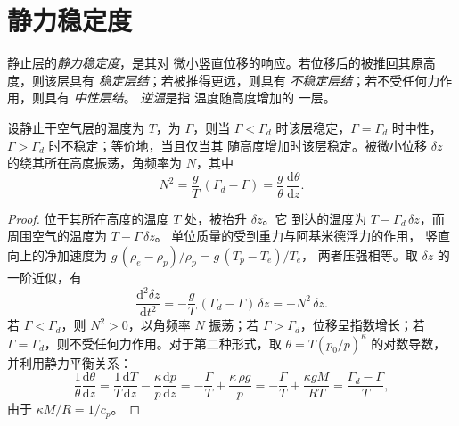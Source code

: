 \section{静力稳定度}\label{sec:b1:fluid-envelopes-structure:stability}

\begin{definition}[静力稳定度；逆温]\label{def:b1:fluid-envelopes-structure:stability}
静止层的\emph{静力稳定度}，是其对
微小竖直位移的响应。若位移后的被推回其原高度，则该层具有
\emph{稳定层结}；若被推得更远，则具有
\emph{不稳定层结}；若不受任何力作用，则具有
\emph{中性层结}。
\emph{逆温}是指
温度随高度增加的
一层。
\end{definition}

\begin{theorem}[静力稳定判据]\label{thm:b1:fluid-envelopes-structure:stability}
设静止干空气层的温度为 $T$，为
$\Gamma$，则当 $\Gamma < \Gamma_d$ 时该层稳定，$\Gamma = \Gamma_d$ 时中性，
$\Gamma > \Gamma_d$ 时不稳定；等价地，当且仅当其
随高度增加时该层稳定。被微小位移
$\delta z$ 的绕其所在高度振荡，角频率为
$N$，其中
\[
  N^2 = \frac{g}{T}\,(\Gamma_d - \Gamma) = \frac{g}{\theta}\,\frac{\mathrm d\theta}{\mathrm dz}.
\]
\end{theorem}

\begin{proof}
位于其所在高度的温度 $T$ 处，被抬升 $\delta z$。它
到达的温度为 $T - \Gamma_d\,\delta z$，而周围空气的温度为 $T - \Gamma\,\delta z$。
单位质量的受到重力与阿基米德浮力的作用，
竖直向上的净加速度为 $g\,(\rho_e - \rho_p)/\rho_p = g\,(T_p - T_e)/T_e$，
两者压强相等。取 $\delta z$ 的一阶近似，有
\[
  \frac{\mathrm d^2 \delta z}{\mathrm dt^2} = -\frac{g}{T}\,(\Gamma_d - \Gamma)\,\delta z = -N^2\,\delta z .
\]
若 $\Gamma < \Gamma_d$，则 $N^2 > 0$，以角频率
$N$ 振荡；若 $\Gamma > \Gamma_d$，位移呈指数增长；若
$\Gamma = \Gamma_d$，则不受任何力作用。对于第二种形式，取
$\theta = T (p_0/p)^{\kappa}$ 的对数导数，并利用静力平衡关系：
\[
  \frac{1}{\theta}\frac{\mathrm d\theta}{\mathrm dz} = \frac{1}{T}\frac{\mathrm dT}{\mathrm dz}
  - \frac{\kappa}{p}\frac{\mathrm dp}{\mathrm dz} = -\frac{\Gamma}{T} + \frac{\kappa\,\rho g}{p}
  = -\frac{\Gamma}{T} + \frac{\kappa g M}{RT} = \frac{\Gamma_d - \Gamma}{T},
\]
由于 $\kappa M/R = 1/c_p$。
\end{proof}

